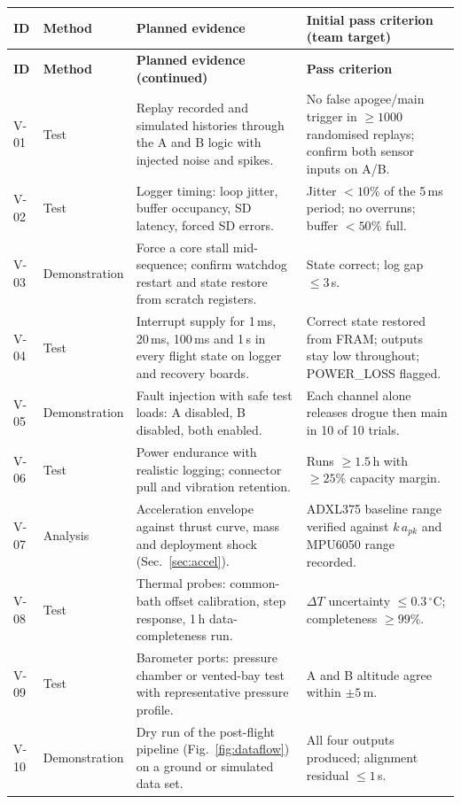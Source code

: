 \small
{}
\begin{longtable}{@{}L{11mm}L{23mm}L{70mm}L{42mm}@{}}
\toprule{}\textbf{ID}&\textbf{Method}&\textbf{Planned evidence}&\textbf{Initial pass criterion (team target)}\\\midrule\endfirsthead
\toprule{}\textbf{ID}&\textbf{Method}&\textbf{Planned evidence (continued)}&\textbf{Pass criterion}\\\midrule\endhead
\bottomrule\endlastfoot
V-01 & Test & Replay recorded and simulated histories through the A and B logic with injected noise and spikes. & No false apogee/main trigger in $\ge1000$ randomised replays; confirm both sensor inputs on A/B.\\
V-02 & Test & Logger timing: loop jitter, buffer occupancy, SD latency, forced SD errors. & Jitter $<10\%$ of the 5\,ms period; no overruns; buffer $<50\%$ full.\\
V-03 & Demonstration & Force a core stall mid-sequence; confirm watchdog restart and state restore from scratch registers. & State correct; log gap $\le3$\,s.\\
V-04 & Test & Interrupt supply for 1\,ms, 20\,ms, 100\,ms and 1\,s in every flight state on logger and recovery boards. & Correct state restored from FRAM; outputs stay low throughout; POWER\_LOSS flagged.\\
V-05 & Demonstration & Fault injection with safe test loads: A disabled, B disabled, both enabled. & Each channel alone releases drogue then main in 10 of 10 trials.\\
V-06 & Test & Power endurance with realistic logging; connector pull and vibration retention. & Runs $\ge1.5$\,h with $\ge25\%$ capacity margin.\\
V-07 & Analysis & Acceleration envelope against thrust curve, mass and deployment shock (Sec.~\ref{sec:accel}). & ADXL375 baseline range verified against $k\,a_{pk}$ and MPU6050 range recorded.\\
V-08 & Test & Thermal probes: common-bath offset calibration, step response, 1\,h data-completeness run. & $\Delta T$ uncertainty $\le0.3\,^{\circ}$C; completeness $\ge99\%$.\\
V-09 & Test & Barometer ports: pressure chamber or vented-bay test with representative pressure profile. & A and B altitude agree within $\pm5$\,m.\\
V-10 & Demonstration & Dry run of the post-flight pipeline (Fig.~\ref{fig:dataflow}) on a ground or simulated data set. & All four outputs produced; alignment residual $\le1$\,s.\\

\end{longtable}
